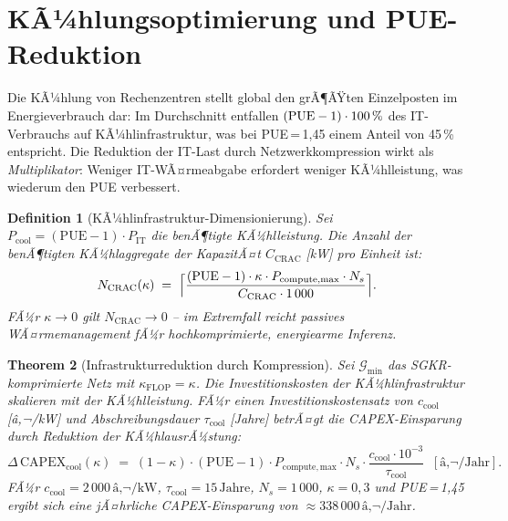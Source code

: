 ﻿\documentclass[12pt, a4paper, openany]{report}
\newtheorem{theorem}{Theorem}[chapter]
\newtheorem{definition}[theorem]{Definition}
\newcommand{\calG}{\mathcal{G}}
\begin{document}
\section{KÃ¼hlungsoptimierung und PUE-Reduktion}
\label{sec:cooling}

Die KÃ¼hlung von Rechenzentren stellt global den grÃ¶ÃŸten Einzelposten im
Energieverbrauch dar: Im Durchschnitt entfallen $({\rm PUE} - 1) \cdot 100\,\%$
des IT-Verbrauchs auf KÃ¼hlinfrastruktur, was bei PUE\,=\,1{,}45 einem
Anteil von 45\,\% entspricht.  Die Reduktion der IT-Last durch
Netzwerkkompression wirkt als \emph{Multiplikator}: Weniger IT-WÃ¤rmeabgabe
erfordert weniger KÃ¼hlleistung, was wiederum den PUE verbessert.

\begin{definition}[KÃ¼hlinfrastruktur-Dimensionierung]
\label{def:cooling_dimensioning}
Sei $P_{\mathrm{cool}} = (\mathrm{PUE} - 1) \cdot P_{\mathrm{IT}}$ die
benÃ¶tigte KÃ¼hlleistung.  Die Anzahl der benÃ¶tigten KÃ¼hlaggregate der
KapazitÃ¤t $C_{\mathrm{CRAC}}$ [kW] pro Einheit ist:
\begin{equation}
  \label{eq:n_crac}
  N_{\mathrm{CRAC}}(\kappa)
  \;=\;
  \Bigl\lceil
    \frac{(\mathrm{PUE}-1) \cdot \kappa \cdot P_{\mathrm{compute,max}} \cdot N_s}
         {C_{\mathrm{CRAC}} \cdot 1\,000}
  \Bigr\rceil.
\end{equation}
FÃ¼r $\kappa \to 0$ gilt $N_{\mathrm{CRAC}} \to 0$ -- im Extremfall reicht
passives WÃ¤rmemanagement fÃ¼r hochkomprimierte, energiearme Inferenz.
\end{definition}

\begin{theorem}[Infrastrukturreduktion durch Kompression]
\label{thm:infra_reduction}
Sei $\calG_{\min}$ das SGKR-komprimierte Netz mit $\kappa_{\mathrm{FLOP}} = \kappa$.
Die Investitionskosten der KÃ¼hlinfrastruktur skalieren mit der KÃ¼hlleistung.
FÃ¼r einen Investitionskostensatz von $c_{\mathrm{cool}}$ [â‚¬/kW] und
Abschreibungsdauer $\tau_{\mathrm{cool}}$ [Jahre] betrÃ¤gt die
CAPEX-Einsparung durch Reduktion der KÃ¼hlausrÃ¼stung:
\begin{equation}
  \label{eq:capex_cooling}
  \Delta\,\mathrm{CAPEX}_{\mathrm{cool}}(\kappa)
  \;=\;
  (1 - \kappa) \cdot (\mathrm{PUE} - 1) \cdot P_{\mathrm{compute,max}} \cdot N_s
  \cdot \frac{c_{\mathrm{cool}} \cdot 10^{-3}}{\tau_{\mathrm{cool}}}
  \;\;[\text{â‚¬/Jahr}].
\end{equation}
FÃ¼r $c_{\mathrm{cool}} = 2\,000\,\text{â‚¬/kW}$, $\tau_{\mathrm{cool}} = 15\,\text{Jahre}$,
$N_s = 1\,000$, $\kappa = 0{,}3$ und PUE\,=\,1{,}45 ergibt sich eine
jÃ¤hrliche CAPEX-Einsparung von $\approx 338\,000\,\text{â‚¬/Jahr}$.
\end{theorem}
\end{document}
